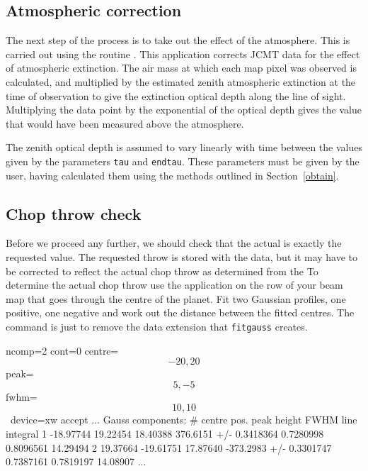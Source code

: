 \documentclass[11pt,noabs]{starlink}
\begin{document}
\subsection{\label{extinct}Atmospheric correction}

   The next step of the process is to take out the effect of the
   atmosphere. This is carried out using the routine
\texttt{}.
   This application corrects JCMT data for the effect of atmospheric
   extinction. The air mass at which each map pixel was observed is
   calculated, and multiplied by the estimated zenith atmospheric
   extinction at the time of observation to give the extinction optical
   depth along the line of sight. Multiplying the data point by the
   exponential of the optical depth gives the value that would have been
   measured above the atmosphere.



   The zenith optical depth is assumed to
   vary linearly with time between the values given by the parameters
   \texttt{tau} and \texttt{endtau}. These parameters must be
   given by the user, having calculated them using the methods outlined
   in
Section~\ref{obtain}.

\begin{terminalv}
\end{terminalv}


\subsection{\label{throwchk}Chop throw check}

   Before we proceed any further, we should check that the actual
   is exactly the requested value. The requested throw is stored with
   the data, but it may have to be corrected to reflect the actual
   chop throw as determined from the
   To determine the actual chop throw use the application
\texttt{}
   on the row of your beam map that goes through the centre of the
   planet. Fit two Gaussian profiles, one positive, one negative and
   work out the distance between the fitted centres. The
\texttt{}
   command is just to remove the data extension that \texttt{fitgauss}
   creates.

\begin{terminalv}
 ncomp=2 cont=0 centre=\[-20,20\] peak=\[5,-5\] fwhm=\[10,10\] \
 device=xw accept
...
Gauss components:
 #   centre pos.    peak height       FWHM       line integral
 1    -18.97744       19.22454       18.40388       376.6151
+/-   0.3418364      0.7280998      0.8096561       14.29494
 2     19.37664      -19.61751       17.87640      -373.2983
+/-   0.3301747      0.7387161      0.7819197       14.08907
...
\end{terminalv}
\end{document}
